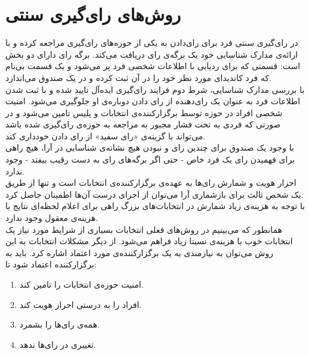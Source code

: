 \section{روش‌های رای‌گیری سنتی}
\par
در رای‌گیری سنتی فرد برای رای‌دادن به یکی از حوزه‌های رای‌گیری مراجعه کرده و با ارائه‌ی مدارک شناسایی خود یک برگه‌ی رای دریافت می‌کند. برگه رای دارای دو بخش است: قسمتی که برای ردیابی با اطلاعات شخصی فرد پر می‌شود و یک قسمت بی‌نام که فرد کاندیدای مورد نظر خود را در آن ثبت کرده و در یک صندوق می‌اندازد. 
\\
با بررسی مدارک شناسایی، شرط دوم فرایند رای‌گیری ایده‌آل تایید شده و با ثبت شدن اطلاعات فرد به عنوان یک رای‌دهنده از رای دادن دوباره‌ی او جلوگیری می‌شود. امنیت شخصی افراد در حوزه توسط برگزارکننده‌ی انتخابات و پلیس تامین می‌شود و در صورتی که فردی به تحت فشار مجبور به مراجعه به حوزه‌ی رای‌گیری شده باشد می‌تواند با گزینه‌ی «رای‌ سفید» از رای دادن خودداری کند.
\\
با وجود یک صندوق برای چندین رای و نبودن هیچ نشانه‌ی شناسایی در آرا، هیچ راهی برای فهمیدن رای یک فرد خاص - حتی اگر برگه‌های رای به دست رقیب بیفتد - وجود ندارد. 
\\
احزار هویت و شمارش رای‌ها به عهده‌ی برگزارکننده‌ی انتخابات است و تنها از طریق یک شخص ثالث برای باز‌شماری آرا می‌توان از اجرای درست آن‌ها اطمینان حاصل کرد.
\\
با توجه به هزینه‌ی زیاد شمارش در انتخابات‌های بزرگ راهی برای اعلام لحظه‌ا‌ی نتایج با هزینه‌ی معقول وجود ندارد.
\\
همانطور که می‌بینیم در روش‌های فعلی انتخابات بسیاری از شرایط مورد نیاز یک انتخابات خوب  با هزینه‌ی نسبتا زیاد فراهم می‌شود. از دیگر مشکلات انتخابات به این روش می‌توان به نیازمندی به یک برگزارکننده‌ی مورد اعتماد اشاره کرد. باید به برگزارکننده اعتماد شود تا: 
\begin{enumerate}
	\item 
	امنیت حوزه‌ی انتخابات را تامین کند.
	\item 
	افراد را به درستی احراز هویت کند.
	\item 
	همه‌ی رای‌ها را بشمرد.
	\item 
	تغییری در رای‌ها ندهد.
	
\end{enumerate}
 


